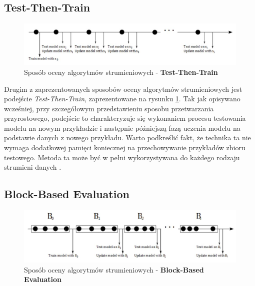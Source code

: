 \subsection{Test-Then-Train}
\label{Secton:TestThenTrain}

\begin{figure}[h] 
    \centering
    \includegraphics[width=15cm]{figures/online_processing.JPG}
    \caption{Sposób oceny algorytmów strumieniowych - \textbf{Test-Then-Train} \cite{Prezentacja:Strumienie}}\label{Figure:TestThenTrain}
\end{figure}

\noindent Drugim z zaprezentowanych sposobów oceny algorytmów strumieniowych jest podejście \textit{Test-Then-Train}, zaprezentowane na rysunku \ref{Figure:TestThenTrain}. Tak jak opisywano wcześniej, przy szczegółowym przedstawieniu sposobu przetwarzania przyrostowego, podejście to charakteryzuje się wykonaniem procesu testowania modelu na nowym przykładzie i następnie późniejszą fazą uczenia modelu na podstawie danych z nowego przykładu. Warto podkreślić fakt, że technika ta nie wymaga dodatkowej pamięci koniecznej na przechowywanie przykładów zbioru testowego. Metoda ta może być w pełni wykorzystywana do każdego rodzaju strumieni danych \cite{PHD:Kirkby}.

\subsection{Block-Based Evaluation}

\begin{figure}[h] 
    \centering
    \includegraphics[width=15cm]{figures/block_processing.JPG}
    \caption{Sposób oceny algorytmów strumieniowych - \textbf{Block-Based Evaluation} \cite{Prezentacja:Strumienie}}\label{Figure:BlockBasedEvaluation}
\end{figure}

